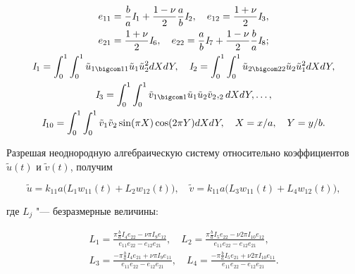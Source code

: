 \begin{gather}

e_{11}=\frac{b}{a}\mathit{I}_1+\frac{1-\nu}{2}\frac{a}{b}\mathit{I}_2, \quad 

e_{12}=\frac{1+\nu}{2}\mathit{I}_3,\\

e_{21}=\frac{1+\nu}{2}\mathit{I}_6,\quad 

e_{22}=\frac{a}{b}\mathit{I}_7+\frac{1-\nu}{2}\frac{b}{a}\mathit{I}_8;

\\

\mathit{I}_1=\int_0^1 \int_0^1 \tilde{u}_{1 \bigcom 11} \tilde{u}_1 \tilde{u}_2^2dX dY,\quad 

\mathit{I}_2=\int_0^1 \int_0^1 \tilde{u}_{2  \bigcom 22}\tilde{u}_2\tilde{u}_1^2dX dY,

\\

\mathit{I}_3=\int_0^1 \int_0^1 \tilde{v}_{1\bigcom 1}\tilde{u}_1\tilde{u}_2 \tilde{v}_2,_{2}dX dY, \dots,

\\

\mathit{I}_{10}=\int_0^1 \int_0^1 \tilde{v}_1 \tilde{v}_2 \sin (\pi X )\cos (2\pi Y )dX dY,\quad  X={x}/{a}, \quad  Y={y}/{b}.

\end{gather}



Разрешая неоднородную алгебраическую систему относительно коэффициентов $\tilde{u}(t)$ и $\tilde{v}(t)$, получим

\begin{equation}\label{bel_eq9}

\tilde{u}=k_{11}a\bigl(L_1 w_{11}(t)+L_2 w_{12}(t) \bigr),\quad 

\tilde{v}=k_{11}a\bigl(L_3 w_{11}(t)+L_4 w_{12}(t) \bigr),

\end{equation}

где $L_j$ "--- безразмерные величины:

\begin{gather}

L_1=\frac{\pi \frac{b}{a}\mathit{I}_4e_{22}-\nu \pi \mathit{I}_9 e_{12} }{e_{11} e_{22}-e_{12}e_{21}},\quad L_2=\frac{\pi \frac{b}{a}\mathit{I}_5e_{22}-\nu 2 \pi \mathit{I}_{10} e_{12} }{e_{11} e_{22}-e_{12}e_{21}}, 

\\

L_3=\frac{-\pi \frac{b}{a}\mathit{I}_4e_{21}+\nu \pi \mathit{I}_9 e_{11} }{e_{11} e_{22}-e_{12}e_{21}},\quad L_4=\frac{-\pi \frac{b}{a}\mathit{I}_5e_{21}+\nu 2 \pi \mathit{I}_{10} e_{11} }{e_{11} e_{22}-e_{12}e_{21}}. 

\end{gather}

